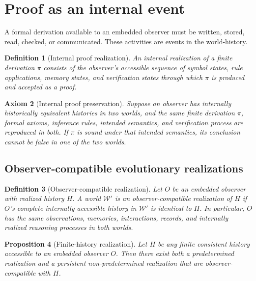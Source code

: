 \documentclass[11pt]{article}
\newtheorem{definition}{Definition}[section]
\newtheorem{axiom}[definition]{Axiom}
\newtheorem{proposition}[definition]{Proposition}
\newcommand{\World}{\mathcal W}
\begin{document}
\section{Proof as an internal event}

A formal derivation available to an embedded observer must be written, stored, read, checked,
or communicated.  These activities are events in the world-history.

\begin{definition}[Internal proof realization]
An internal realization of a finite derivation \(\pi\) consists of the observer's accessible
sequence of symbol states, rule applications, memory states, and verification states through
which \(\pi\) is produced and accepted as a proof.
\end{definition}

\begin{axiom}[Internal proof preservation]\label{ax:proof}
Suppose an observer has internally historically equivalent histories in two worlds, and the
same finite derivation \(\pi\), formal axioms, inference rules, intended semantics, and
verification process are reproduced in both.  If \(\pi\) is sound under that intended
semantics, its conclusion cannot be false in one of the two worlds.
\end{axiom}


\subsection{Observer-compatible evolutionary realizations}

\begin{definition}[Observer-compatible realization]
Let \(O\) be an embedded observer with realized history \(H\). A world
\(\World'\) is an \emph{observer-compatible realization} of \(H\) if
\(O\)'s complete internally accessible history in \(\World'\) is identical
to \(H\). In particular, \(O\) has the same observations, memories,
interactions, records, and internally realized reasoning processes in both
worlds.
\end{definition}


\begin{proposition}[Finite-history realization]
\label{prop:finite-realization}
Let \(H\) be any finite consistent history accessible to an embedded
observer \(O\). Then there exist both a predetermined realization and a
persistent non-predetermined realization that are observer-compatible with
\(H\).
\end{proposition}
\end{document}
